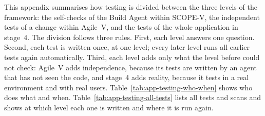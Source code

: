 \documentclass[10pt,a4paper]{article}
\begin{document}
This appendix summarises how testing is divided between the three levels of
the framework: the self-checks of the Build Agent within SCOPE-V, the
independent tests of a change within Agile~V, and the tests of the whole
application in stage~4. The division follows three rules. First, each level
answers one question. Second, each test is written once, at one level; every
later level runs all earlier tests again automatically. Third, each level
adds only what the level before could not check: Agile~V adds independence,
because its tests are written by an agent that has not seen the code, and
stage~4 adds reality, because it tests in a real environment and with real
users. Table~\ref{tab:app-testing-who-when} shows who does what and when.
Table~\ref{tab:app-testing-all-tests} lists all tests and scans and shows at
which level each one is written and where it is run again.

\end{document}
